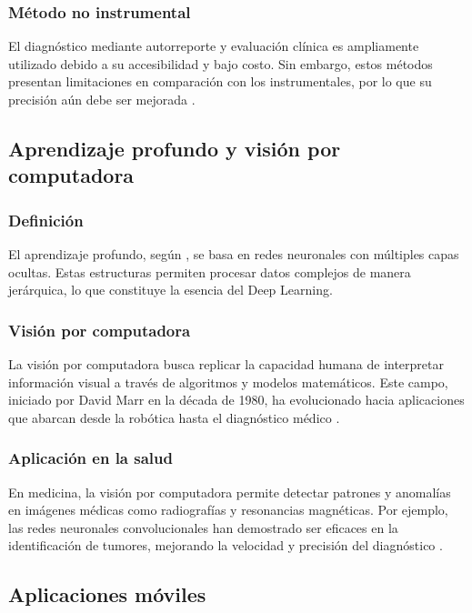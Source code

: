 \subsubsection{Método no instrumental}  
El diagnóstico mediante autorreporte y evaluación clínica es ampliamente utilizado debido a su accesibilidad y bajo costo. Sin embargo, estos métodos presentan limitaciones en comparación con los instrumentales, por lo que su precisión aún debe ser mejorada \parencite{gutierrez2021bruxismorino}.

\subsection{Aprendizaje profundo y visión por computadora}

\subsubsection{Definición}  
El aprendizaje profundo, según \textcite{kim2017matlabdeeplearning}, se basa en redes neuronales con múltiples capas ocultas. Estas estructuras permiten procesar datos complejos de manera jerárquica, lo que constituye la esencia del Deep Learning.

\subsubsection{Visión por computadora}  
La visión por computadora busca replicar la capacidad humana de interpretar información visual a través de algoritmos y modelos matemáticos. Este campo, iniciado por David Marr en la década de 1980, ha evolucionado hacia aplicaciones que abarcan desde la robótica hasta el diagnóstico médico \parencite{szeliski2010computervision}.

\subsubsection{Aplicación en la salud}  
En medicina, la visión por computadora permite detectar patrones y anomalías en imágenes médicas como radiografías y resonancias magnéticas. Por ejemplo, las redes neuronales convolucionales han demostrado ser eficaces en la identificación de tumores, mejorando la velocidad y precisión del diagnóstico \parencite{litjens2017deeplearningmedical}.

\subsection{Aplicaciones móviles}

